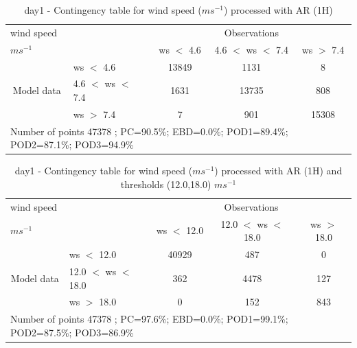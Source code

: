 \begin{table}[h!]
\begin{center}
\begin{tabular}{llccc}
\hline
{wind speed}                                       &                                                    & \multicolumn{3}{c}{Observations}                 \\
{$m s^{-1}$}                                       &                             & ws $<$ 4.6   & 4.6 $<$ ws $<$ 7.4 & ws $>$ 7.4 \\
\hline
\multicolumn{1}{c}{\multirow{3}{*}{Model data}}  & ws $<$ 4.6             & 13849                & 1131                       & 8              \\
                                                 & 4.6  $<$ ws $<$ 7.4 & 1631                & 13735                       & 808              \\
                                                 & ws $>$ 7.4             & 7                & 901                       & 15308              \\
\hline 
\multicolumn{5}{l}{ Number of points        47378 ; PC=90.5\%; EBD=0.0\%; POD1=89.4\%; POD2=87.1\%; POD3=94.9\%}                 \\
\end{tabular}
\end{center}
\caption{day1 - Contingency table for  wind speed ($m s^{-1}$) processed with AR (1H)}
\label{tab:contingencywsAFT:day1}
\end{table}
\begin{table}[h!]
\begin{center}
\begin{tabular}{llccc}
\hline
{wind speed}                                       &                                                    & \multicolumn{3}{c}{Observations}                 \\
{$m s^{-1}$}                                       &                             & ws $<$ 12.0   & 12.0 $<$ ws $<$ 18.0 & ws $>$ 18.0 \\
\hline
\multicolumn{1}{c}{\multirow{3}{*}{Model data}}  & ws $<$ 12.0             & 40929                & 487                       & 0              \\
                                                 & 12.0  $<$ ws $<$ 18.0 & 362                & 4478                       & 127              \\
                                                 & ws $>$ 18.0             & 0                & 152                       & 843              \\
\hline 
\multicolumn{5}{l}{ Number of points        47378 ; PC=97.6\%; EBD=0.0\%; POD1=99.1\%; POD2=87.5\%; POD3=86.9\%}                 \\
\end{tabular}
\end{center}
\caption{day1 - Contingency table for  wind speed ($m s^{-1}$) processed with AR (1H) and thresholds (12.0,18.0) $m s^{-1}$}
\label{tab:contingencywsAFT:day1}
\end{table}
